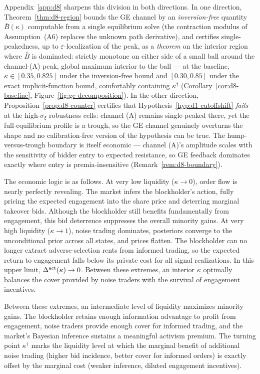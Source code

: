 \documentclass[11pt]{article}
\newcommand{\1}{\mathbf{1}}
\begin{document}
Appendix~\ref{app:d8} sharpens this division in both directions. In one
direction, Theorem~\ref{thm:d8-region} bounds the GE channel by an
\emph{inversion-free} quantity $\bar B(\kappa)$ computable from a single
equilibrium solve (the contraction modulus of Assumption~\textup{(A6)} replaces
the unknown path derivative), and certifies single-peakedness, up to
$\varepsilon$-localization of the peak, as a \emph{theorem} on the interior
region where $\bar B$ is dominated: strictly monotone on either side of a
small ball around the channel-(A) peak, global maximum interior to the ball
--- at the baseline, $\kappa\in[0.35,0.825]$ under the inversion-free bound and
$[0.30,0.85]$ under the exact implicit-function bound, comfortably containing
$\kappa^{\dagger}$ (Corollary~\ref{cor:d8-baseline}, Figure~\ref{fig:ge-decomposition}).
In the other direction, Proposition~\ref{prop:d8-counter} certifies that
Hypothesis~\ref{hyp:d1-cutoffshift} \emph{fails} at the high-$\sigma_\xi$
robustness cells: channel (A) remains single-peaked there, yet the
full-equilibrium profile is a trough, so the GE channel genuinely overturns the
shape and no calibration-free version of the hypothesis can be true. The
hump-versus-trough boundary is itself economic --- channel (A)'s amplitude
scales with the sensitivity of bidder entry to expected resistance, so GE
feedback dominates exactly where entry is premia-insensitive
(Remark~\ref{rem:d8-boundary}).

The economic logic is as follows. At very low liquidity ($\kappa \to 0$), order flow is nearly perfectly revealing. The market infers the blockholder's action, fully pricing the expected engagement into the share price and deterring marginal takeover bids. Although the blockholder still benefits fundamentally from engagement, this bid deterrence suppresses the overall minority gains. At very high liquidity ($\kappa \to 1$), noise trading dominates, posteriors converge to the unconditional prior across all states, and prices flatten. The blockholder can no longer extract adverse-selection rents from informed trading, so the expected return to engagement falls below its private cost for all signal realizations. In this upper limit, $\Delta^{\textup{act}}(\kappa)\to 0$. Between these extremes, an interior $\kappa$ optimally balances the cover provided by noise traders with the survival of engagement incentives.

Between these extremes, an intermediate level of liquidity maximizes minority gains. The blockholder retains enough information advantage to profit from engagement, noise traders provide enough cover for informed trading, and the market's Bayesian inference sustains a meaningful activism premium. The turning point $\kappa^{\dagger}$ marks the liquidity level at which the marginal benefit of additional noise trading (higher bid incidence, better cover for informed orders) is exactly offset by the marginal cost (weaker inference, diluted engagement incentives).
\end{document}
